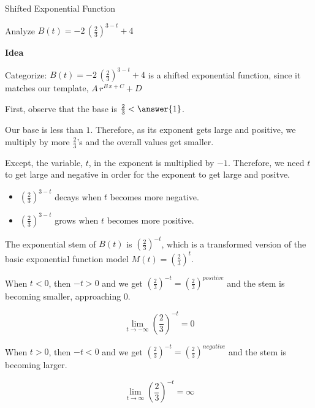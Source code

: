 \documentclass{ximera}
\begin{document}
\begin{example}  Shifted Exponential Function



Analyze   $B(t) = -2 \, \left( \frac{2}{3} \right)^{3-t} + 4$ 


\textbf{\textcolor{blue!55!black}{Idea}} 


Categorize: $B(t) = -2 \, \left( \frac{2}{3} \right)^{3-t} + 4$  is a shifted exponential function, since it matches our template, $A \, r^{B \, x + C} +D$ 




First, observe that the base is $\frac{2}{3} < \answer{1}$.


Our base is less than $1$.  Therefore, as its exponent gets large and positive, we multiply by more $\frac{2}{3}$'s and the overall values get smaller.


Except, the variable, $t$, in the exponent is multiplied by $-1$.  Therefore, we need $t$ to get large and negative in order for the exponent to get large and positve.


\begin{itemize}
\item $\left( \frac{2}{3} \right)^{3-t}$ decays when $t$ becomes more negative.
\item $\left( \frac{2}{3} \right)^{3-t}$ grows when $t$ becomes more positive.
\end{itemize}







The exponential stem of $B(t)$ is $\left( \frac{2}{3} \right)^{-t}$, which is a transformed version of the basic exponential function model $M(t) = \left( \frac{2}{3} \right)^{t}$.  



When $t < 0$, then $-t > 0$ and we get  $\left( \frac{2}{3} \right)^{-t} = \left( \frac{2}{3} \right)^{positive}$ and the stem is becoming smaller, approaching $0$.  





\[ \lim\limits_{t \to -\infty} \left( \frac{2}{3} \right)^{-t} = 0 \]



When $t > 0$, then $-t < 0$ and we get  $\left( \frac{2}{3} \right)^{-t} = \left( \frac{2}{3} \right)^{negative}$ and the stem is becoming larger.  



\[ \lim\limits_{t \to \infty} \left( \frac{2}{3} \right)^{-t} = \infty \]














\end{example}
\end{document}

